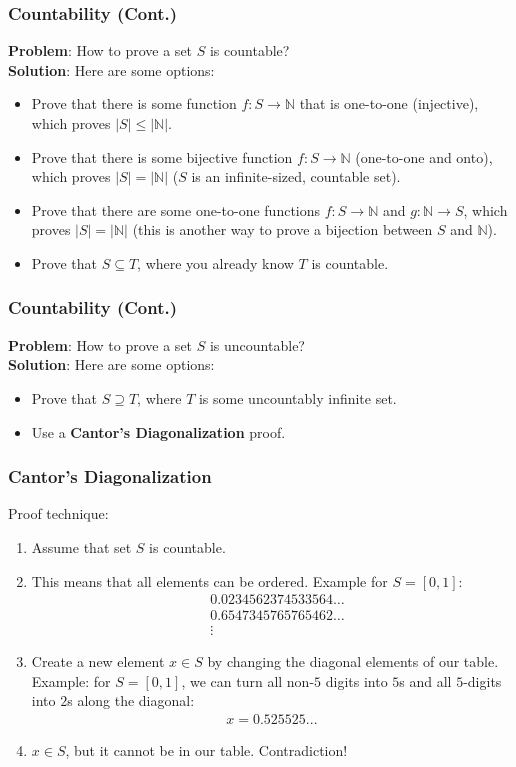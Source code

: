 \documentclass{beamer}
\begin{document}
\begin{frame}
    \frametitle{Countability (Cont.)}
    {\bf Problem}: How to prove a set $S$ is countable?\\
    {\bf Solution}: Here are some options:
    \begin{itemize}
        \item Prove that there is some function $f:S\rightarrow\mathbb{N}$ that is one-to-one (injective), which proves $|S|\leq|\mathbb{N}|$.
        \item Prove that there is some bijective function $f:S\rightarrow\mathbb{N}$ (one-to-one and onto), which proves $|S|=|\mathbb{N}|$ ($S$ is an infinite-sized, countable set).
        \item Prove that there are some one-to-one functions $f:S\rightarrow\mathbb{N}$ and $g:\mathbb{N}\rightarrow S$, which proves $|S|=|\mathbb{N}|$ (this is another way to prove a bijection between $S$ and $\mathbb{N}$).
        \item Prove that $S\subseteq T$, where you already know $T$ is countable.
    \end{itemize}
\end{frame}

\begin{frame}
    \frametitle{Countability (Cont.)}
    {\bf Problem}: How to prove a set $S$ is uncountable?\\
    {\bf Solution}: Here are some options:
    \begin{itemize}
        \item Prove that $S\supseteq T$, where $T$ is some uncountably infinite set.
        \item Use a {\bf Cantor's Diagonalization} proof.
    \end{itemize}
\end{frame}

\begin{frame}
    \frametitle{Cantor's Diagonalization}
    Proof technique:
    \begin{enumerate}
        \item Assume that set $S$ is countable.
        \item This means that all elements can be ordered. Example for $S=[0,1]$:
        \begin{align*}
            &0.0234562374533564\dots\\
            &0.6547345765765462\dots\\
            &\vdots
        \end{align*}
        \item Create a new element $x\in S$ by changing the diagonal elements of our table. Example: for $S=[0,1]$, we can turn all non-$5$ digits into $5$s and all $5$-digits into $2$s along the diagonal:
        \begin{align*}
            x=0.525525...
        \end{align*}
        \item $x\in S$, but it cannot be in our table. Contradiction!
    \end{enumerate}
\end{frame}
\end{document}
